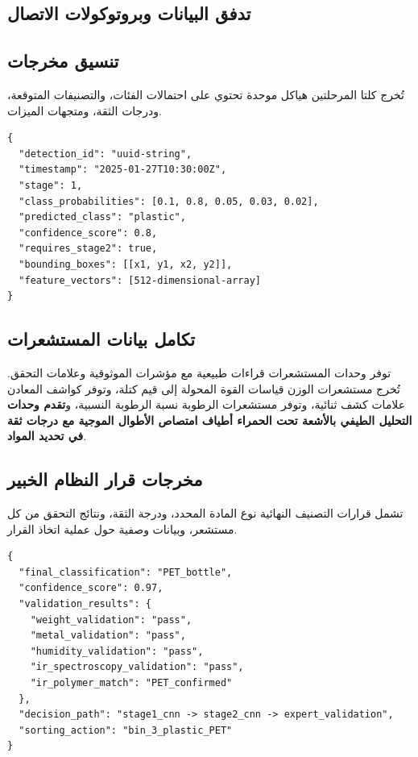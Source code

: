 \documentclass[11pt, a4paper]{article}
\begin{document}
\begin{RTL}
\section{تدفق البيانات وبروتوكولات الاتصال}
\subsection{تنسيق مخرجات }
تُخرج كلتا المرحلتين هياكل  موحدة تحتوي على احتمالات الفئات، والتصنيفات المتوقعة، ودرجات الثقة، ومتجهات الميزات.
\begin{english}
\begin{lstlisting}[style=jsonstyle, caption={مثال على مخرجات \lr{CNN} بتنسيق \lr{JSON}}]
{
  "detection_id": "uuid-string",
  "timestamp": "2025-01-27T10:30:00Z",
  "stage": 1,
  "class_probabilities": [0.1, 0.8, 0.05, 0.03, 0.02],
  "predicted_class": "plastic",
  "confidence_score": 0.8,
  "requires_stage2": true,
  "bounding_boxes": [[x1, y1, x2, y2]],
  "feature_vectors": [512-dimensional-array]
}
\end{lstlisting}
\end{english}

\subsection{تكامل بيانات المستشعرات}
توفر وحدات المستشعرات قراءات طبيعية مع مؤشرات الموثوقية وعلامات التحقق. تُخرج مستشعرات الوزن قياسات القوة المحولة إلى قيم كتلة، وتوفر كواشف المعادن علامات كشف ثنائية، وتوفر مستشعرات الرطوبة نسبة الرطوبة النسبية، و\textbf{تقدم وحدات التحليل الطيفي بالأشعة تحت الحمراء أطياف امتصاص الأطوال الموجية مع درجات ثقة في تحديد المواد}.

\subsection{مخرجات قرار النظام الخبير}
تشمل قرارات التصنيف النهائية نوع المادة المحدد، ودرجة الثقة، ونتائج التحقق من كل مستشعر، وبيانات وصفية حول عملية اتخاذ القرار.
\begin{english}
\begin{lstlisting}[style=jsonstyle, caption={مثال على مخرجات النظام الخبير بتنسيق \lr{JSON}}]
{
  "final_classification": "PET_bottle",
  "confidence_score": 0.97,
  "validation_results": {
    "weight_validation": "pass",
    "metal_validation": "pass", 
    "humidity_validation": "pass",
    "ir_spectroscopy_validation": "pass",
    "ir_polymer_match": "PET_confirmed"
  },
  "decision_path": "stage1_cnn -> stage2_cnn -> expert_validation",
  "sorting_action": "bin_3_plastic_PET"
}
\end{lstlisting}
\end{english}


\end{RTL}
\end{document}

